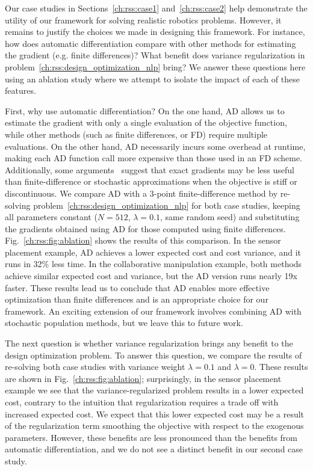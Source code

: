 Our case studies in Sections~\ref{ch:rss:case1} and~\ref{ch:rss:case2} help demonstrate the utility of our framework for solving realistic robotics problems. However, it remains to justify the choices we made in designing this framework. For instance, how does automatic differentiation compare with other methods for estimating the gradient (e.g. finite differences)? What benefit does variance regularization in problem~\eqref{ch:rss:design_optimization_nlp} bring? We answer these questions here using an ablation study where we attempt to isolate the impact of each of these features.

First, why use automatic differentiation? On the one hand, AD allows us to estimate the gradient with only a single evaluation of the objective function, while other methods (such as finite differences, or FD) require multiple evaluations. On the other hand, AD necessarily incurs some overhead at runtime, making each AD function call more expensive than those used in an FD scheme. Additionally, some arguments~\cite{suh2021_bundled_gradients} suggest that exact gradients may be less useful than finite-difference or stochastic approximations when the objective is stiff or discontinuous. We compare AD with a 3-point finite-difference method by re-solving problem~\eqref{ch:rss:design_optimization_nlp} for both case studies, keeping all parameters constant ($N=512$, $\lambda=0.1$, same random seed) and substituting the gradients obtained using AD for those computed using finite differences. Fig.~\ref{ch:rss:fig:ablation} shows the results of this comparison. In the sensor placement example, AD achieves a lower expected cost and cost variance, and it runs in 32\% less time. In the collaborative manipulation example, both methods achieve similar expected cost and variance, but the AD version runs nearly 19x faster. These results lead us to conclude that AD enables more effective optimization than finite differences and is an appropriate choice for our framework. An exciting extension of our framework involves combining AD with stochastic population methods, but we leave this to future work.

The next question is whether variance regularization brings any benefit to the design optimization problem. To answer this question, we compare the results of re-solving both case studies with variance weight $\lambda = 0.1$ and $\lambda = 0$. These results are shown in Fig.~\ref{ch:rss:fig:ablation}; surprisingly, in the sensor placement example we see that the variance-regularized problem results in a lower expected cost, contrary to the intuition that regularization requires a trade off with increased expected cost. We expect that this lower expected cost may be a result of the regularization term smoothing the objective with respect to the exogenous parameters. However, these benefits are less pronounced than the benefits from automatic differentiation, and we do not see a distinct benefit in our second case study.

